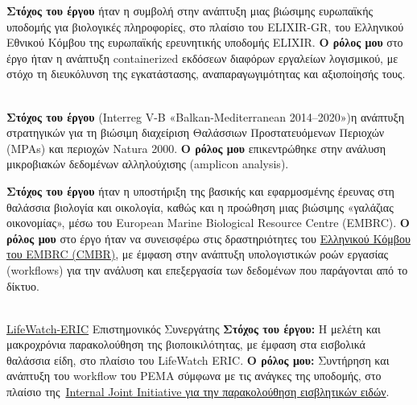 \documentclass[
    a4paper,
]{../fortysecondscv}
\begin{document}
\begin{cvtable}[1]
            {
         \textbf{Στόχος του έργου} ήταν η συμβολή στην ανάπτυξη μιας βιώσιμης ευρωπαϊκής υποδομής για βιολογικές πληροφορίες, στο πλαίσιο του ELIXIR-GR, του Ελληνικού Εθνικού Κόμβου της ευρωπαϊκής ερευνητικής υποδομής ELIXIR. 
         \textbf{Ο ρόλος μου} στο έργο ήταν η ανάπτυξη containerized εκδόσεων διαφόρων εργαλείων λογισμικού, με στόχο τη διευκόλυνση της εγκατάστασης, αναπαραγωγιμότητας και αξιοποίησής τους.   
        }

      \\
        
            {
         \textbf{Στόχος του έργου} (Interreg V-B «Balkan-Mediterranean 2014–2020»)η ανάπτυξη στρατηγικών για τη βιώσιμη διαχείριση Θαλάσσιων Προστατευόμενων Περιοχών (MPAs) και περιοχών Natura 2000. 
         \textbf{Ο ρόλος μου} επικεντρώθηκε στην ανάλυση μικροβιακών δεδομένων αλληλούχισης  (amplicon analysis).
        }

    \end{cvtable}




    \begin{cvtable}[1]

            {
         \textbf{Στόχος του έργου} ήταν η υποστήριξη της βασικής και εφαρμοσμένης έρευνας στη θαλάσσια βιολογία και οικολογία, καθώς και η προώθηση μιας βιώσιμης «γαλάζιας οικονομίας», μέσω του European Marine Biological Resource Centre (EMBRC). 
         \textbf{Ο ρόλος μου} στο έργο ήταν να συνεισφέρω στις δραστηριότητες του 
         \href{https://www.embrc.eu/embrc-network/greece}{Ελληνικού Κόμβου του EMBRC (CMBR)}, με έμφαση στην ανάπτυξη υπολογιστικών ροών εργασίας (workflows) για την ανάλυση και επεξεργασία των δεδομένων που παράγονται από το δίκτυο.
        }

     \\

         {\href{https://www.lifewatch.eu}{LifeWatch-ERIC}}
         {Επιστημονικός Συνεργάτης}
         {
            \textbf{Στόχος του έργου:} Η μελέτη και μακροχρόνια παρακολούθηση της βιοποικιλότητας, με έμφαση στα εισβολικά θαλάσσια είδη, στο πλαίσιο του LifeWatch ERIC.
            \textbf{Ο ρόλος μου:} Συντήρηση και ανάπτυξη του workflow του PEMA σύμφωνα με τις ανάγκες της υποδομής, στο πλαίσιο της~\href{https://www.lifewatch.eu/internal-joint-initiative/validation-cases/long-term-monitoring-of-invasive-marine-species/}{Internal Joint Initiative για την παρακολούθηση εισβλητικών ειδών}.
         }

    \end{cvtable}
\end{document}
